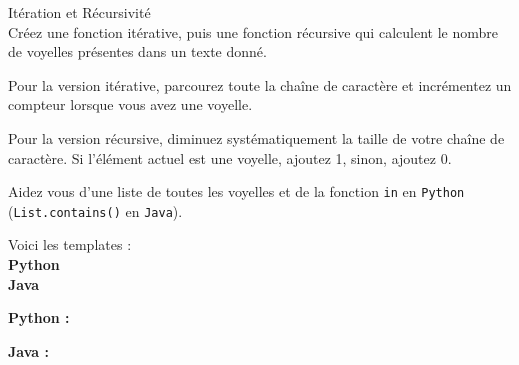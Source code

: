 \begin{Exercice}[15 minutes] Itération et Récursivité\\

Créez une fonction itérative, puis une fonction récursive qui calculent le nombre de voyelles présentes dans un texte donné. \\

\begin{conseil}
   Pour la version itérative, parcourez toute la chaîne de caractère et incrémentez un compteur lorsque vous avez une voyelle.
   
   Pour la version récursive, diminuez systématiquement la taille de votre chaîne de caractère. Si l'élément actuel est une voyelle, ajoutez 1, sinon, ajoutez 0.
   
   Aidez vous d'une liste de toutes les voyelles et de la fonction \lstinline{in} en \lstinline{Python} (\lstinline{List.contains()} en \lstinline{Java}).
\end{conseil}

Voici les templates : \\

\textbf{Python} \\

     

\textbf{Java} \\

    

    
\begin{solution}
\textbf{Python :} \\

    
    
\end{solution}


\begin{solution}   
\textbf{Java :} \\

    
    
    
    
\end{solution}

\end{Exercice}

